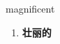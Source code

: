 
\begin{frame}
{\huge magnificent}
\begin{center}
\begin{enumerate}\Large
  \item \textbf{壮丽的}
\end{enumerate}
\end{center}
\end{frame}

